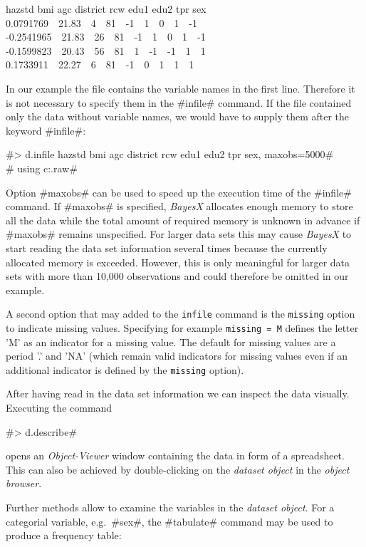 {\footnotesize
 hazstd bmi agc district rcw edu1 edu2 tpr sex\\
 0.0791769 \,\, 21.83 \,\, 4 \,\, 81 \,\, -1 \,\, 1 \,\, 0 \,\, 1 \,\, -1\\
 -0.2541965 \,\, 21.83 \,\, 26 \,\, 81 \,\, -1 \,\, 1 \,\, 0 \,\, 1 \,\, -1\\
 -0.1599823 \,\, 20.43 \,\, 56 \,\, 81 \,\, 1 \,\, -1 \,\, -1 \,\, 1 \,\, 1\\
 0.1733911 \,\, 22.27 \,\, 6 \,\, 81 \,\, -1 \,\, 0 \,\, 1 \,\, 1 \,\, 1}

In our example the file contains the variable names in the first
line. Therefore  it is not necessary to specify them in the
#infile# command. If the file contained only the data without
variable names, we would have to supply them after the keyword
#infile#:

 #> d.infile hazstd bmi agc district rcw edu1 edu2 tpr sex, maxobs=5000#\\
 #  using c:\data\zambia.raw#


Option #maxobs# can be used to speed up the execution time of the
#infile# command. If #maxobs# is specified, {\it BayesX} allocates
enough memory to store all the data while the total amount of
required memory is unknown in advance if #maxobs# remains
unspecified. For larger data sets this may cause {\it BayesX} to
start reading the data set information several times because the
currently allocated memory is exceeded. However, this is only
meaningful for larger data sets with more than 10,000 observations
and could therefore be omitted in our example.

A second option that may added to the {\tt infile} command is the
{\tt missing} option to indicate missing values. Specifying for
example {\tt missing = M} defines the letter 'M' as an
indicator for a missing value. The default for missing values are
a period '.' and 'NA' (which remain valid indicators for
missing values even if an additional indicator is defined by the
{\tt missing} option).

After having read in the data set information we can inspect the
data visually. Executing the command

#> d.describe#

opens an {\it Object-Viewer} window containing the data in form of
a spreadsheet. This can also be achieved by double-clicking on the
{\it dataset object} in the {\it object browser}.

Further methods allow to examine the variables in the {\it dataset
object}. For a categorial variable, e.g.~#sex#, the #tabulate#
command may be used to produce a frequency table:

